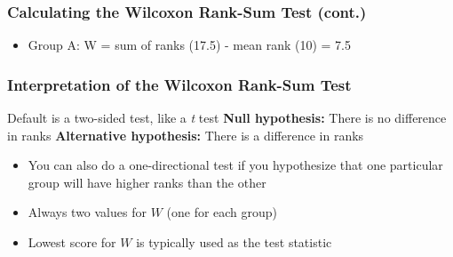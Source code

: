 \documentclass[12pt, block=fill]{beamer}
\begin{document}
\begin{frame}
  \frametitle{Calculating the Wilcoxon Rank-Sum Test (cont.)}
  
  \begin{center}
  \end{center}

  \begin{itemize}
    \item Group A: W = sum of ranks (17.5) - mean rank (10) = 7.5
  \end{itemize}
    
\end{frame}


\begin{frame}
  \frametitle{Interpretation of the Wilcoxon Rank-Sum Test}

  \begin{exampleblock}{Default is a two-sided test, like a \textit{t} test}
    \textbf{Null hypothesis:} There is no difference in ranks
    \textbf{Alternative hypothesis:} There is a difference in ranks
  \end{exampleblock}
  
  \begin{itemize}
      \item You can also do a one-directional test if you hypothesize that one particular group will have higher ranks than the other
      \item Always two values for $W$ (one for each group)
      \item Lowest score for $W$ is typically used as the test statistic
  \end{itemize}
  
\end{frame}
\end{document}
